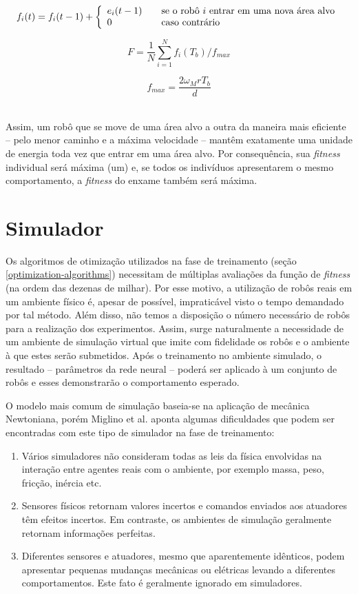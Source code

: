 $$
f_{i} (t) = f_{i} (t - 1) + \left\{
\begin{array}{l l}
e_{i}(t - 1) & \quad \text{se o robô $i$ entrar em uma nova área alvo}\\
0 & \quad \text{caso contrário}
\end{array} \right.
$$

\noindent\begin{minipage}{.5\linewidth}
$$
F = \frac{1}{N} \sum_{i=1}^{N} f_{i} (T_{b}) / f_{max}
$$
\end{minipage}%
\begin{minipage}{.5\linewidth}
$$
f_{max} = \frac{2 \omega_{M} r T_{b}}{d}
$$
\end{minipage}\\

Assim, um robô que se move de uma área alvo a outra da maneira mais eficiente -- pelo menor caminho e a máxima velocidade -- mantêm exatamente uma unidade de energia toda vez que entrar em uma área alvo. Por consequência, sua \textit{fitness} individual será máxima (um) e, se todos os indivíduos apresentarem o mesmo comportamento, a \textit{fitness} do enxame também será máxima.

\section{Simulador}

Os algoritmos de otimização utilizados na fase de treinamento (seção \ref{optimization-algorithms}) necessitam de múltiplas avaliações da função de \textit{fitness} (na ordem das dezenas de milhar). Por esse motivo, a utilização de robôs reais em um ambiente físico é, apesar de possível, impraticável visto o tempo demandado por tal método. Além disso, não temos a disposição o número necessário de robôs para a realização dos experimentos. Assim, surge naturalmente a necessidade de um ambiente de simulação virtual que imite com fidelidade os robôs e o ambiente à que estes serão submetidos. Após o treinamento no ambiente simulado, o resultado -- parâmetros da rede neural -- poderá ser aplicado à um conjunto de robôs e esses demonstrarão o comportamento esperado.

O modelo mais comum de simulação baseia-se na aplicação de mecânica Newtoniana, porém Miglino et al. \cite{miglino96evolving} aponta algumas dificuldades que podem ser encontradas com este tipo de simulador na fase de treinamento:
\begin{enumerate}
    \item Vários simuladores não consideram todas as leis da física envolvidas na interação entre agentes reais com o ambiente, por exemplo massa, peso, fricção, inércia etc.
    \item Sensores físicos retornam valores incertos e comandos enviados aos atuadores têm efeitos incertos. Em contraste, os ambientes de simulação geralmente retornam informações perfeitas.
    \item Diferentes sensores e atuadores, mesmo que aparentemente idênticos, podem apresentar pequenas mudanças mecânicas ou elétricas levando a diferentes comportamentos. Este fato é geralmente ignorado em simuladores.
\end{enumerate}

